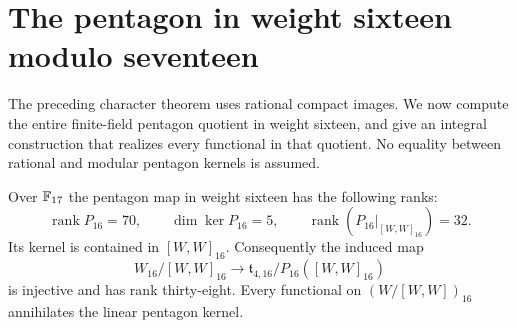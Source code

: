 \section{The pentagon in weight sixteen modulo seventeen}
\label{sec:mod17}
The preceding character theorem uses rational compact images.  We now
compute the entire finite-field pentagon quotient in weight sixteen,
and give an integral construction that realizes every functional in that
quotient.  No equality between rational and modular pentagon kernels is
assumed.

\begin{theorem}\label{thm:pentagon17}
Over $\mathbb F_{17}$ the pentagon map in weight sixteen has the following ranks:
\[
 \operatorname{rank}P_{16}=70,\qquad
 \dim\ker P_{16}=5,\qquad
 \operatorname{rank}(P_{16}|_{[W,W]_{16}})=32.
\]
Its kernel is contained in $[W,W]_{16}$.  Consequently the induced map
\[
 W_{16}/[W,W]_{16}\longrightarrow
 \mathfrak t_{4,16}/P_{16}([W,W]_{16})
\]
is injective and has rank thirty-eight.  Every functional on
$(W/[W,W])_{16}$ annihilates the linear pentagon kernel.
\end{theorem}
